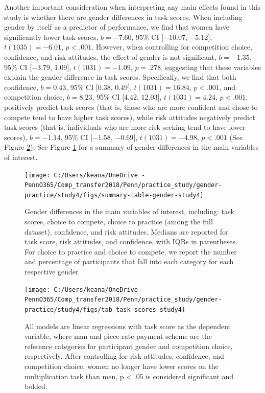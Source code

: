 \documentclass[a4paper, nobind]{templates/ociamthesis}
\begin{document}
Another important consideration when interpreting any main effects found in this study is whether there are gender differences in task scores. When including gender by itself as a predictor of performance, we find that women have significantly lower task scores, \(b = -7.60\), 95\% CI \([-10.07\), \(-5.12]\), \(t(1035) = -6.01\), \(p < .001\). However, when controlling for competition choice, confidence, and risk attitudes, the effect of gender is not significant, \(b = -1.35\), 95\% CI \([-3.79\), \(1.09]\), \(t(1031) = -1.09\), \(p = .278\), suggesting that these variables explain the gender difference in task scores. Specifically, we find that both confidence, \(b = 0.43\), 95\% CI \([0.38\), \(0.49]\), \(t(1031) = 16.84\), \(p < .001\), and competition choice, \(b = 8.23\), 95\% CI \([4.42\), \(12.03]\), \(t(1031) = 4.24\), \(p < .001\), positively predict task scores (that is, those who are more confident and chose to compete tend to have higher task scores), while risk attitudes negatively predict task scores (that is, individuals who are more risk seeking tend to have lower scores), \(b = -1.14\), 95\% CI \([-1.58\), \(-0.69]\), \(t(1031) = -4.98\), \(p < .001\) (See Figure \ref{fig:tab-task-scores-study4}). See Figure \ref{fig:summary-table-gender-study4} for a summary of gender differences in the main variables of interest.

\begin{figure}

{\centering \texttt{[image: C:/Users/keana/OneDrive - PennO365/Comp\_transfer2018/Penn/practice\_study/gender-practice/study4/figs/summary-table-gender-study4]} 

}

\caption{Gender differences in the main variables of interest, including: task scores, choice to compete, choice to practice (among the full dataset), confidence, and risk attitudes. Medians are reported for task score, risk attitudes, and confidence, with IQRs in parentheses. For choice to practice and choice to compete, we report the number and percentage of participants that fall into each category for each respective gender}\label{fig:summary-table-gender-study4}
\end{figure}

\begin{figure}

{\centering \texttt{[image: C:/Users/keana/OneDrive - PennO365/Comp\_transfer2018/Penn/practice\_study/gender-practice/study4/figs/tab\_task-scores-study4]} 

}

\caption{All models are linear regressions with task score as the dependent variable, where man and piece-rate payment scheme are the reference categories for participant gender and competition choice, respectively. After controlling for risk attitudes, confidence, and competition choice, women no longer have lower scores on the multiplication task than men, p < .05 is considered significant and bolded.}\label{fig:tab-task-scores-study4}
\end{figure}
\end{document}
